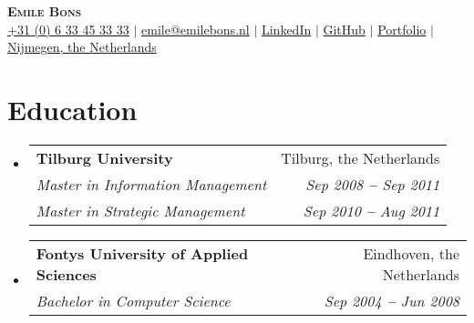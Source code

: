 \documentclass[letterpaper,11pt]{article}
\makeatletter
\newcommand{\resumeItem}[1]{
  \item\small{
    {#1 \vspace{-2pt}}
  }
}
\newcommand{\resumeSubheading}[4]{
  \vspace{-2pt}\item
    \begin{tabular*}{0.97\textwidth}[t]{l@{\extracolsep{\fill}}r}
      \textbf{#1} & #2 \\
      \textit{\small#3} & \textit{\small #4} \\
    \end{tabular*}\vspace{-7pt}
}
\newcommand{\resumeEducationHeading}[6]{
  \vspace{-2pt}\item
    \begin{tabular*}{0.97\textwidth}[t]{l@{\extracolsep{\fill}}r}
      \textbf{#1} & #2 \\
      \textit{\small#3} & \textit{\small #4} \\
      \textit{\small#5} & \textit{\small #6} \\
    \end{tabular*}\vspace{-5pt}
}
\newcommand{\resumeSubHeadingListStart}{\begin{itemize}[leftmargin=0.15in, label={}]}
\newcommand{\resumeSubHeadingListEnd}{\end{itemize}}
\newcommand{\resumeItemListStart}{\begin{itemize}}
\newcommand{\resumeItemListEnd}{\end{itemize}\vspace{-5pt}}
\makeatother
\begin{document}

\begin{center}
    \textbf{\Huge \scshape Emile Bons} \\ \vspace{3pt}
    \small
    \faMobile \hspace{.5pt} \href{tel:+31633453333}{+31 (0) 6 33 45 33 33}
    $|$
    \faAt \hspace{.5pt} \href{mailto:emile@emilebons.nl}{emile@emilebons.nl}
    $|$
    \faLinkedinSquare \hspace{.5pt} \href{https://nl.linkedin.com/in/emilebons}{LinkedIn}
    $|$
    \faGithub \hspace{.5pt} \href{https://github.com/EmileBons}{GitHub}
    $|$
    \faGlobe \hspace{.5pt} \href{https://emilebons.nl}{Portfolio}
    $|$
    \faMapMarker \hspace{.5pt} \href{https://maps.app.goo.gl/KBT5icMPuSiESg8X8}{Nijmegen, the Netherlands}
\end{center}




\section{Education}
  \vspace{3pt}
  \resumeSubHeadingListStart
    
    \resumeEducationHeading
      {Tilburg University
      }{Tilburg, the Netherlands}
      {Master in Information Management}{Sep 2008 \textbf{--} Sep 2011}
      {Master in Strategic Management}{Sep 2010 \textbf{--} Aug 2011}
    
    \resumeSubheading
      {Fontys University of Applied Sciences}{Eindhoven, the Netherlands}
      {Bachelor in Computer Science}{Sep 2004 \textbf{--} Jun 2008}
    
  \resumeSubHeadingListEnd
\end{document}
